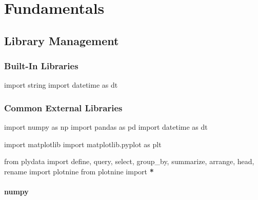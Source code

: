\documentclass[
]{book}
\newenvironment{Shaded}{\begin{snugshade}}{\end{snugshade}}
\newcommand{\ImportTok}[1]{#1}
\newcommand{\NormalTok}[1]{#1}
\newcommand{\OperatorTok}[1]{\textcolor[rgb]{0.43,0.43,0.43}{\textbf{#1}}}
\begin{document}
\hypertarget{fundamentals}{%
\chapter{Fundamentals}\label{fundamentals}}

\hypertarget{library-management}{%
\section{Library Management}\label{library-management}}

\hypertarget{built-in-libraries}{%
\subsection{Built-In Libraries}\label{built-in-libraries}}

\begin{Shaded}
\begin{Highlighting}[]
\ImportTok{import}\NormalTok{ string}
\ImportTok{import}\NormalTok{ datetime }\ImportTok{as}\NormalTok{ dt}
\end{Highlighting}
\end{Shaded}

\hypertarget{common-external-libraries}{%
\subsection{Common External Libraries}\label{common-external-libraries}}

\begin{Shaded}
\begin{Highlighting}[]
\ImportTok{import}\NormalTok{ numpy }\ImportTok{as}\NormalTok{ np}
\ImportTok{import}\NormalTok{ pandas }\ImportTok{as}\NormalTok{ pd}
\ImportTok{import}\NormalTok{ datetime }\ImportTok{as}\NormalTok{ dt}

\ImportTok{import}\NormalTok{ matplotlib}
\ImportTok{import}\NormalTok{ matplotlib.pyplot }\ImportTok{as}\NormalTok{ plt}

\ImportTok{from}\NormalTok{ plydata }\ImportTok{import}\NormalTok{ define, query, select, group\_by, summarize, arrange, head, rename}
\ImportTok{import}\NormalTok{ plotnine}
\ImportTok{from}\NormalTok{ plotnine }\ImportTok{import} \OperatorTok{*}
\end{Highlighting}
\end{Shaded}

\hypertarget{numpy}{%
\subsubsection{numpy}\label{numpy}}
\end{document}
